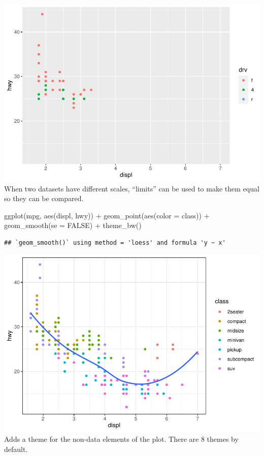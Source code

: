 \documentclass[
]{article}
\newenvironment{Shaded}{\begin{snugshade}}{\end{snugshade}}
\newcommand{\AttributeTok}[1]{\textcolor[rgb]{0.77,0.63,0.00}{#1}}
\newcommand{\ConstantTok}[1]{\textcolor[rgb]{0.00,0.00,0.00}{#1}}
\newcommand{\FunctionTok}[1]{\textcolor[rgb]{0.00,0.00,0.00}{#1}}
\newcommand{\NormalTok}[1]{#1}
\newcommand{\SpecialCharTok}[1]{\textcolor[rgb]{0.00,0.00,0.00}{#1}}
\begin{document}
\includegraphics{Assignments_files/figure-latex/unnamed-chunk-71-2.pdf}
When two datasets have different scales, ``limits'' can be used to make
them equal so they can be compared.

\begin{Shaded}
\begin{Highlighting}[]
\FunctionTok{ggplot}\NormalTok{(mpg, }\FunctionTok{aes}\NormalTok{(displ, hwy)) }\SpecialCharTok{+}
  \FunctionTok{geom\_point}\NormalTok{(}\FunctionTok{aes}\NormalTok{(}\AttributeTok{color =}\NormalTok{ class)) }\SpecialCharTok{+}
  \FunctionTok{geom\_smooth}\NormalTok{(}\AttributeTok{se =} \ConstantTok{FALSE}\NormalTok{) }\SpecialCharTok{+}
  \FunctionTok{theme\_bw}\NormalTok{()}
\end{Highlighting}
\end{Shaded}

\begin{verbatim}
## `geom_smooth()` using method = 'loess' and formula 'y ~ x'
\end{verbatim}

\includegraphics{Assignments_files/figure-latex/unnamed-chunk-72-1.pdf}
Adds a theme for the non-data elements of the plot. There are 8 themes
by default.
\end{document}
